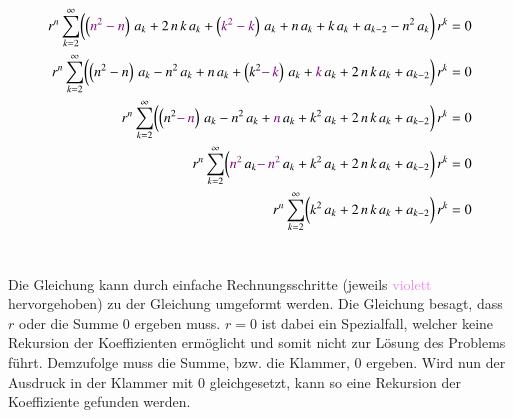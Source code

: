 \begin{align}
	\nonumber
	r^n
	\sum_{k=2}^{\infty}
	\biggl(
	\left( \textcolor{violet}{n^2 - n} \right) \, a_k 
	+
	2 \, n \, k \, a_k
	+
	\left( \textcolor{violet}{k^2 - k} \right) \, a_k
	+
	n \, a_k
	+
	k \, a_k
	+
	a_{k - 2}
	-
	n^2 \, a_k
	\biggr)
	\, r^k
	= 0 
	\\
	\nonumber
	r^n
	\sum_{k=2}^{\infty}
	\biggl(
	\left( n^2 - n \right) \, a_k 
	-
	n^2 \, a_k
	+
	n \, a_k
	+
	\left( k^2 \textcolor{violet}{ - \, k} \right) \, a_k
	+
	\textcolor{violet}{k} \, a_k
	+
	2 \, n \, k \, a_k
	+
	a_{k - 2}
	\biggr)
	\, r^k
	= 0 
	\\
	\nonumber
	r^n
	\sum_{k=2}^{\infty}
	\biggl(
	\left( n^2 \textcolor{violet}{ - \, n} \right) \, a_k 
	-
	n^2 \, a_k
	+
	\textcolor{violet}{n} \, a_k
	+
	k^2 \, a_k
	+
	2 \, n \, k \, a_k
	+
	a_{k - 2}
	\biggr)
	\, r^k
	= 0 
	\\
	\nonumber
	r^n
	\sum_{k=2}^{\infty}
	\biggl(
	\textcolor{violet}{n^2} \, a_k 
	\textcolor{violet}{- \,
	n^2} \, a_k
	+
	k^2 \, a_k
	+
	2 \, n \, k \, a_k
	+
	a_{k - 2}
	\biggr)
	\, r^k
	= 0 
	\\
	r^n
	\sum_{k=2}^{\infty}
	\biggl(
	k^2 \, a_k
	+
	2 \, n \, k \, a_k
	+
	a_{k - 2}
	\biggr)
	\, r^k
	= 0
	\label{eq:bessel:summe:zusammengefasst:vereinfacht}
\end{align}
\\
\begin{normalsize}
	Die Gleichung  kann durch einfache Rechnungsschritte (jeweils \textcolor{violet}{violett} hervorgehoben) zu der Gleichung  umgeformt werden.
	Die Gleichung  besagt,
	dass $r$ oder die Summe $0$ ergeben muss.
	$r = 0$ ist dabei ein Spezialfall, welcher keine Rekursion der Koeffizienten erm\"oglicht und somit nicht zur L\"osung des Problems f\"uhrt.
	Demzufolge muss die Summe, bzw. die Klammer, $0$ ergeben.
	Wird nun der Ausdruck in der Klammer mit $0$ gleichgesetzt,
	kann so eine Rekursion der Koeffiziente gefunden werden.
\end{normalsize}

